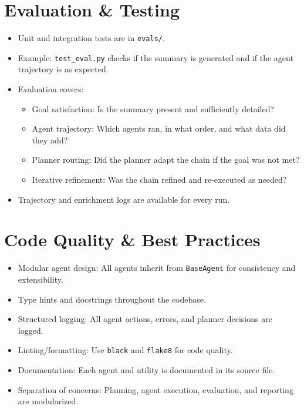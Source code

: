 \documentclass[12pt]{article}
\begin{document}
\section{Evaluation \& Testing}

\begin{itemize}
    \item Unit and integration tests are in \texttt{evals/}.
    \item Example: \texttt{test\_eval.py} checks if the summary is generated and if the agent trajectory is as expected.
    \item Evaluation covers:
    \begin{itemize}
        \item Goal satisfaction: Is the summary present and sufficiently detailed?
        \item Agent trajectory: Which agents ran, in what order, and what data did they add?
        \item Planner routing: Did the planner adapt the chain if the goal was not met?
        \item Iterative refinement: Was the chain refined and re-executed as needed?
    \end{itemize}
    \item Trajectory and enrichment logs are available for every run.
\end{itemize}

\section{Code Quality \& Best Practices}

\begin{itemize}
    \item Modular agent design: All agents inherit from \texttt{BaseAgent} for consistency and extensibility.
    \item Type hints and docstrings throughout the codebase.
    \item Structured logging: All agent actions, errors, and planner decisions are logged.
    \item Linting/formatting: Use \texttt{black} and \texttt{flake8} for code quality.
    \item Documentation: Each agent and utility is documented in its source file.
    \item Separation of concerns: Planning, agent execution, evaluation, and reporting are modularized.
\end{itemize}
\end{document}

